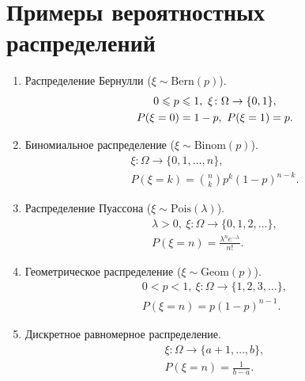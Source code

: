 \section{Примеры вероятностных распределений}

\begin{examples}
    \enewline
        \begin{enumerate}
            \item Распределение Бернулли ($\xi\sim \text{Bern}(p)$).
                   \begin{gather*}
                       0\leqslant p\leqslant 1, \ \xi \colon \Omega \to \{0, 1\},  \\
                       P(\xi = 0) = 1 - p,\ P(\xi = 1) = p.
                   \end{gather*}
   
            \item Биномиальное распределение ($\xi\sim \text{Binom}(p)$).
            \begin{gather*}
                \xi \colon \Omega \rightarrow \{0,1, \ldots, n\}, \\
                P(\xi = k) = \binom{n}{k}p^k(1-p)^{n - k}.
            \end{gather*}
   
            \item Распределение Пуассона ($\xi \sim \text{Pois}(\lambda)$).
            \begin{gather*}
                \lambda > 0, \ \xi \colon \Omega\rightarrow\{0, 1, 2, \ldots\},\\
                P(\xi = n) = \frac{\lambda^n e^{-\lambda}}{n!}.
            \end{gather*}
       
   
            \item Геометрическое распределение ($\xi\sim \text{Geom}(p)$).
            \begin{gather*}
                0< p < 1, \ \xi \colon \Omega\rightarrow \{1, 2, 3, \ldots\}, \\
                P(\xi = n) = p(1-p)^{n - 1}.
            \end{gather*}
   
            \item Дискретное равномерное распределение.
            \begin{gather*}
                \xi \colon \Omega\rightarrow \{a+1, \ldots, b\},\\
                P(\xi = n) = \frac{1}{b - a}.
            \end{gather*}
       

\end{enumerate}
\end{examples}
